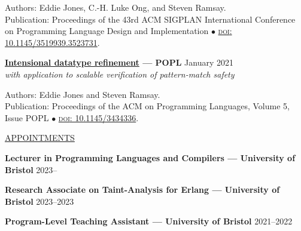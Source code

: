 \documentclass[10pt]{letter}
\renewcommand{\emph}[1]{\textit{#1}}
\newif\iflong
\begin{document}
Authors: Eddie Jones, C.-H. Luke Ong, and Steven Ramsay.\\
Publication: Proceedings of the 43rd ACM SIGPLAN International Conference on Programming Language Design and Implementation \( \bullet \) \href{https://doi.org/10.1145/3519939.3523731}{\textsc{doi}: 10.1145/3519939.3523731}.

\vspace{10pt}

\textbf{\href{https://dl.acm.org/doi/10.1145/3434336}{Intensional datatype refinement} --- POPL} \hfill January 2021\\
\emph{with application to scalable verification of pattern-match safety}

Authors: Eddie Jones and Steven Ramsay.\\
Publication: Proceedings of the ACM on Programming Languages, Volume 5, Issue POPL \( \bullet \) \href{https://doi.org/10.1145/3434336}{\textsc{doi}: 10.1145/3434336}.

\vspace{10pt}

\uline{{\large APPOINTMENTS}\hfill}

\vspace{5pt}

\textbf{Lecturer in Programming Languages and Compilers --- University of Bristol} \hfill 2023--\phantom{2023}

\textbf{Research Associate on Taint-Analysis for Erlang --- University of Bristol} \hfill 2023--2023

\iflong
  \vspace{-5pt}
  \begin{itemize}
    \setlength\itemsep{0pt}
    \item With funding from Meta, we pursued an extension of prior work on intensional datatype refinement type system to Erlang.
          This project aims to statically approximate the flow of private information through a program in order to ensure compliance with data protection guidelines.
  \end{itemize}
\fi

\textbf{Program-Level Teaching Assistant --- University of Bristol} \hfill 2021--2022

\iflong
  \begin{itemize}
    \item As a program-level teaching assistant, I led tutorials designed to cross module boundaries and give students a more comprehensive understanding of computer science outside the curriculum. %

    \item I also contributed content to this series, designing worksheets on bisimulation and the topological aspects of functional programming languages.
  \end{itemize}
\fi
\end{document}
